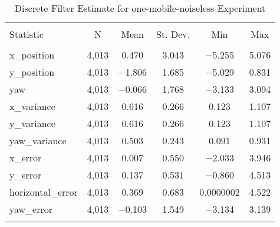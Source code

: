 
\begin{table}[h] \centering 
  \caption{Discrete Filter Estimate for one-mobile-noiseless Experiment} 
  \label{tab:one_mobile_noiseless_discrete_summary} 
\begin{tabular}{@{\extracolsep{5pt}}lccccc} 
\\[-1.8ex]\hline 
\hline \\[-1.8ex] 
Statistic & \multicolumn{1}{c}{N} & \multicolumn{1}{c}{Mean} & \multicolumn{1}{c}{St. Dev.} & \multicolumn{1}{c}{Min} & \multicolumn{1}{c}{Max} \\ 
\hline \\[-1.8ex] 
x\_position & 4,013 & 0.470 & 3.043 & $-$5.255 & 5.076 \\ 
y\_position & 4,013 & $-$1.806 & 1.685 & $-$5.029 & 0.831 \\ 
yaw & 4,013 & $-$0.066 & 1.768 & $-$3.133 & 3.094 \\ 
x\_variance & 4,013 & 0.616 & 0.266 & 0.123 & 1.107 \\ 
y\_variance & 4,013 & 0.616 & 0.266 & 0.123 & 1.107 \\ 
yaw\_variance & 4,013 & 0.503 & 0.243 & 0.091 & 0.931 \\ 
x\_error & 4,013 & 0.007 & 0.550 & $-$2.033 & 3.946 \\ 
y\_error & 4,013 & 0.137 & 0.531 & $-$0.860 & 4.513 \\ 
horizontal\_error & 4,013 & 0.369 & 0.683 & 0.0000002 & 4.522 \\ 
yaw\_error & 4,013 & $-$0.103 & 1.549 & $-$3.134 & 3.139 \\ 
\hline \\[-1.8ex] 
\end{tabular} 
\end{table} 
